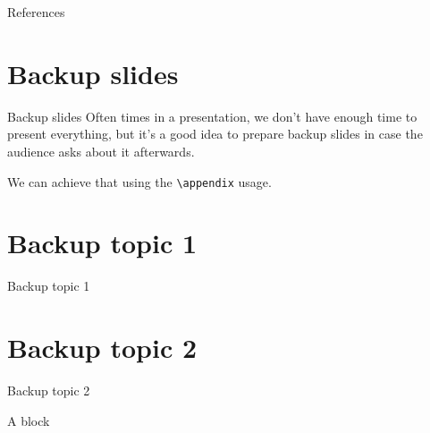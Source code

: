 \documentclass[,aspectratio=43]{beamer}
\begin{document}
\begin{frame}{References}
\label{references}
\printbibliography[heading=none]

\appendix
\backupbegin
\end{frame}

\section{Backup slides}\label{backup-slides}

\begin{frame}[fragile]{Backup slides}
Often times in a presentation, we don't have enough time to present
everything, but it's a good idea to prepare backup slides in case the
audience asks about it afterwards.\bigskip

We can achieve that using the \texttt{\textbackslash{}appendix} usage.
\end{frame}

\section{Backup topic 1}\label{backup-topic-1}

\begin{frame}{Backup topic 1}
\lipsum[1]
\end{frame}

\section{Backup topic 2}\label{backup-topic-2}

\begin{frame}{Backup topic 2}
\begin{block}{A block}
\label{a-block}
\lipsum[4]
\end{block}
\end{frame}



\backupend
\end{document}
